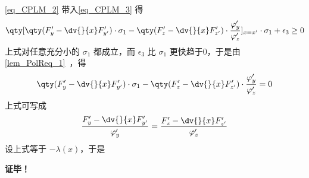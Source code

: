 \autoref{eq_CPLM_2} 带入\autoref{eq_CPLM_3} 得
\begin{equation}
\qty[\qty(F'_y-\dv{}{x}F'_{y'})\cdot\sigma_1-\qty(F'_z-\dv{}{x}F'_{z'})\cdot\frac{\varphi'_y}{\varphi'_z}]_{x=x'}\cdot\sigma_1+\epsilon_3\geq0
\end{equation}
上式对任意充分小的 $\sigma_1$ 都成立，而 $\epsilon_3$ 比 $\sigma_1$ 更快趋于0，于是由\autoref{lem_PolReq_1}~，得
\begin{equation}
\qty(F'_y-\dv{}{x}F'_{y'})\cdot\sigma_1-\qty(F'_z-\dv{}{x}F'_{z'})\cdot\frac{\varphi'_y}{\varphi'_z}=0
\end{equation}
上式可写成
\begin{equation}
\frac{F'_y-\dv{}{x}F'_{y'}}{\varphi'_y}=\frac{F'_z-\dv{}{x}F'_{z'}}{\varphi'_z}
\end{equation}
设上式等于 $-\lambda(x)$，于是

\textbf{证毕！}